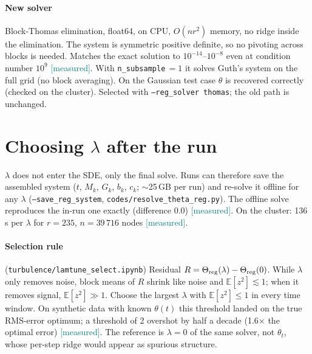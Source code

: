 \documentclass[11pt,a4paper]{article}
\newcommand{\code}[1]{\texttt{#1}}
\newcommand{\meas}{\textcolor{teal}{\textsf{[measured]}}}
\begin{document}
\paragraph{New solver} Block-Thomas elimination, float64, on CPU, $O(n r^2)$ memory,
no ridge inside the elimination. The system is symmetric positive definite, so no pivoting across
blocks is needed. Matches the exact solution to $10^{-14}$--$10^{-8}$ even at condition
number $10^9$ \meas. With \code{n\_subsample}$\,=1$ it solves Guth's system on the full
grid (no block averaging). On the Gaussian test case $\theta$ is recovered correctly
(checked on the cluster). Selected with \code{--reg\_solver thomas}; the old path is unchanged.

\section{Choosing $\lambda$ after the run}
$\lambda$ does not enter the SDE, only the final solve. Runs can therefore save the assembled
system ($t$, $M_k$, $G_k$, $b_k$, $c_k$; $\sim$25\,GB per run) and re-solve it offline for
any $\lambda$ (\code{--save\_reg\_system}, \code{codes/resolve\_theta\_reg.py}). The offline
solve reproduces the in-run one exactly (difference 0.0) \meas. On the cluster: 136\,s per
$\lambda$ for $r=235$, $n=39\,716$ nodes \meas.

\paragraph{Selection rule} (\code{turbulence/lamtune\_select.ipynb}) Residual
$R=\Theta_{\rm reg}(\lambda)-\Theta_{\rm reg}(0)$. While $\lambda$ only removes noise, block
means of $R$ shrink like noise and $\mathbb E[z^2]\lesssim1$; when it removes signal,
$\mathbb E[z^2]\gg1$. Choose the largest $\lambda$ with $\mathbb E[z^2]\le1$ in every time
window. On synthetic data with known $\theta(t)$ this threshold landed on the true
RMS-error optimum; a threshold of 2 overshot by half a decade (1.6$\times$ the optimal error)
\meas. The reference is $\lambda=0$ of the same solver, not $\theta_t$, whose per-step ridge
would appear as spurious structure.
\end{document}
